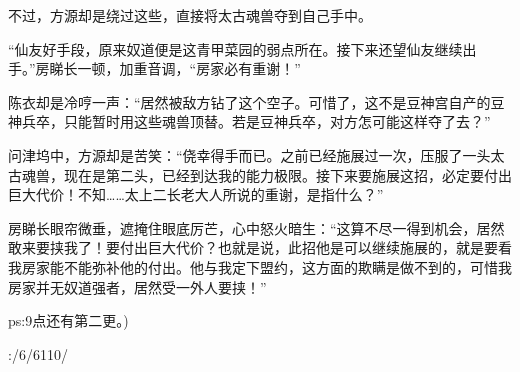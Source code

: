 \begin{this_body}
不过，方源却是绕过这些，直接将太古魂兽夺到自己手中。

“仙友好手段，原来奴道便是这青甲菜园的弱点所在。接下来还望仙友继续出手。”房睇长一顿，加重音调，“房家必有重谢！”

陈衣却是冷哼一声：“居然被敌方钻了这个空子。可惜了，这不是豆神宫自产的豆神兵卒，只能暂时用这些魂兽顶替。若是豆神兵卒，对方怎可能这样夺了去？”

问津坞中，方源却是苦笑：“侥幸得手而已。之前已经施展过一次，压服了一头太古魂兽，现在是第二头，已经到达我的能力极限。接下来要施展这招，必定要付出巨大代价！不知……太上二长老大人所说的重谢，是指什么？”

房睇长眼帘微垂，遮掩住眼底厉芒，心中怒火暗生：“这算不尽一得到机会，居然敢来要挟我了！要付出巨大代价？也就是说，此招他是可以继续施展的，就是要看我房家能不能弥补他的付出。他与我定下盟约，这方面的欺瞒是做不到的，可惜我房家并无奴道强者，居然受一外人要挟！”

ps:9点还有第二更。)

:/6/6110/

\end{this_body}

